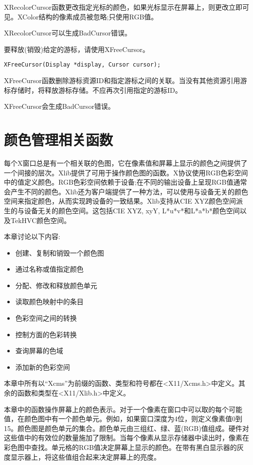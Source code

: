 XRecolorCursor函数更改指定光标的颜色，如果光标显示在屏幕上，则更改立即可见。XColor结构的像素成员被忽略;只使用RGB值。

XRecolorCursor可以生成BadCursor错误。

要释放(销毁)给定的游标，请使用XFreeCursor。

\begin{lstlisting}
XFreeCursor(Display *display, Cursor cursor);
\end{lstlisting}

XFreeCursor函数删除游标资源ID和指定游标之间的关联。当没有其他资源引用游标存储时，将释放游标存储。不应再次引用指定的游标ID。

XFreeCursor会生成BadCursor错误。

\section{颜色管理相关函数}

每个X窗口总是有一个相关联的色图，它在像素值和屏幕上显示的颜色之间提供了一个间接的层次。Xlib提供了可用于操作颜色图的函数。X协议使用RGB色彩空间中的值定义颜色。RGB色彩空间依赖于设备;在不同的输出设备上呈现RGB值通常会产生不同的颜色。Xlib还为客户端提供了一种方法，可以使用与设备无关的颜色空间来指定颜色，从而实现跨设备的一致结果。Xlib支持从CIE XYZ颜色空间派生的与设备无关的颜色空间。这包括CIE XYZ, xyY, L*u*v*和L*a*b*颜色空间以及TekHVC颜色空间。

本章讨论以下内容:
\begin{itemize}
	\item 创建、复制和销毁一个颜色图
	\item 通过名称或值指定颜色
	\item 分配、修改和释放颜色单元
	\item 读取颜色映射中的条目
	\item 色彩空间之间的转换
	\item 控制方面的色彩转换
	\item 查询屏幕的色域
	\item 添加新的色彩空间
\end{itemize}

本章中所有以“Xcms”为前缀的函数、类型和符号都在<X11/Xcms.h>中定义。其余的函数和类型在<X11/Xlib.h>中定义。

本章中的函数操作屏幕上的颜色表示。对于一个像素在窗口中可以取的每个可能值，在颜色图中有一个颜色单元。例如，如果窗口深度为4位，则定义像素值0到15。颜色图是颜色单元的集合。颜色单元由三组红、绿、蓝(RGB)值组成。硬件对这些值中的有效位的数量施加了限制。当每个像素从显示存储器中读出时，像素在彩色图中查找。单元格的RGB值决定屏幕上显示的颜色。在带有黑白显示器的灰度显示器上，将这些值组合起来决定屏幕上的亮度。

